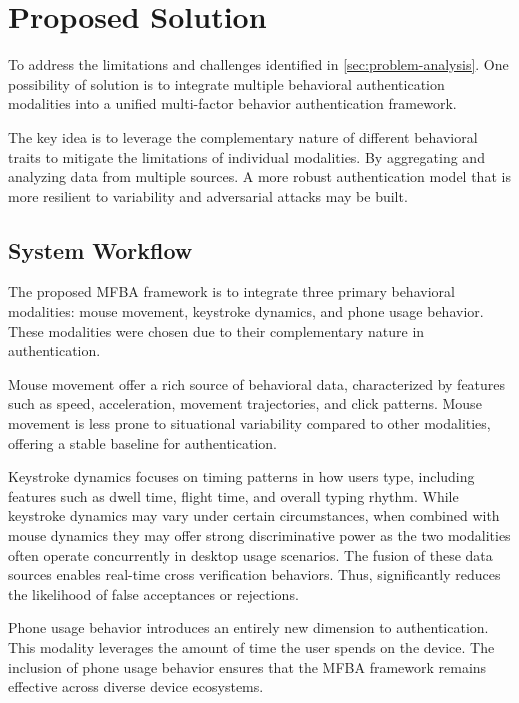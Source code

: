 \section{Proposed Solution}

To address the limitations and challenges identified in \ref{sec:problem-analysis}. One possibility of solution is to integrate multiple behavioral authentication modalities into a unified multi-factor behavior authentication framework.

The key idea is to leverage the complementary nature of different behavioral traits to mitigate the limitations of individual modalities. By aggregating and analyzing data from multiple sources. A more robust authentication model that is more resilient to variability and adversarial attacks may be built.

\subsection{System Workflow}
The proposed MFBA framework is to integrate three primary behavioral modalities: mouse movement, keystroke dynamics, and phone usage behavior. These modalities were chosen due to their complementary nature in authentication.

Mouse movement offer a rich source of behavioral data, characterized by features such as speed, acceleration, movement trajectories, and click patterns. Mouse movement is less prone to situational variability compared to other modalities, offering a stable baseline for authentication.

Keystroke dynamics focuses on timing patterns in how users type, including features such as dwell time, flight time, and overall typing rhythm. While keystroke dynamics may vary under certain circumstances, when combined with mouse dynamics they may offer strong discriminative power as the two modalities often operate concurrently in desktop usage scenarios. The fusion of these data sources enables real-time cross verification behaviors. Thus, significantly reduces the likelihood of false acceptances or rejections.

Phone usage behavior introduces an entirely new dimension to authentication. This modality leverages the amount of time the user spends on the device. The inclusion of phone usage behavior ensures that the MFBA framework remains effective across diverse device ecosystems.

